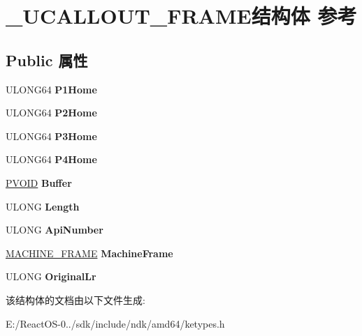 \hypertarget{struct___u_c_a_l_l_o_u_t___f_r_a_m_e}{}\section{\+\_\+\+U\+C\+A\+L\+L\+O\+U\+T\+\_\+\+F\+R\+A\+M\+E结构体 参考}
\label{struct___u_c_a_l_l_o_u_t___f_r_a_m_e}
\subsection*{Public 属性}
\begin{DoxyCompactItemize}
\item 
\mbox{\label{struct___u_c_a_l_l_o_u_t___f_r_a_m_e_ab72fe6d94263aaedadbb5933eb7e732d}} 
U\+L\+O\+N\+G64 {\bfseries P1\+Home}
\item 
\mbox{\label{struct___u_c_a_l_l_o_u_t___f_r_a_m_e_afa8794a3aa2d9ba96de241877bc0a8f8}} 
U\+L\+O\+N\+G64 {\bfseries P2\+Home}
\item 
\mbox{\label{struct___u_c_a_l_l_o_u_t___f_r_a_m_e_af824b039eb360d99979ccbbbbfb04a7c}} 
U\+L\+O\+N\+G64 {\bfseries P3\+Home}
\item 
\mbox{\label{struct___u_c_a_l_l_o_u_t___f_r_a_m_e_afc27b360a911bfbd84fa2b7565f42dc2}} 
U\+L\+O\+N\+G64 {\bfseries P4\+Home}
\item 
\mbox{\label{struct___u_c_a_l_l_o_u_t___f_r_a_m_e_aac26783c81e7e1941bdfbdec0599d200}} 
\hyperlink{interfacevoid}{P\+V\+O\+ID} {\bfseries Buffer}
\item 
\mbox{\label{struct___u_c_a_l_l_o_u_t___f_r_a_m_e_ad63e40b515c13cf36e9a28f6fa2444d1}} 
U\+L\+O\+NG {\bfseries Length}
\item 
\mbox{\label{struct___u_c_a_l_l_o_u_t___f_r_a_m_e_aa08c69ef46eb6c725128feed3583126a}} 
U\+L\+O\+NG {\bfseries Api\+Number}
\item 
\mbox{\label{struct___u_c_a_l_l_o_u_t___f_r_a_m_e_a4903c8d26a9a21f5f849eddc23e7b907}} 
\hyperlink{struct___m_a_c_h_i_n_e___f_r_a_m_e}{M\+A\+C\+H\+I\+N\+E\+\_\+\+F\+R\+A\+ME} {\bfseries Machine\+Frame}
\item 
\mbox{\label{struct___u_c_a_l_l_o_u_t___f_r_a_m_e_af1f77dfec30a5161e63a06ec3100c8cc}} 
U\+L\+O\+NG {\bfseries Original\+Lr}
\end{DoxyCompactItemize}


该结构体的文档由以下文件生成\+:\begin{DoxyCompactItemize}
\item 
E\+:/\+React\+O\+S-\/0../sdk/include/ndk/amd64/ketypes.\+h\end{DoxyCompactItemize}
